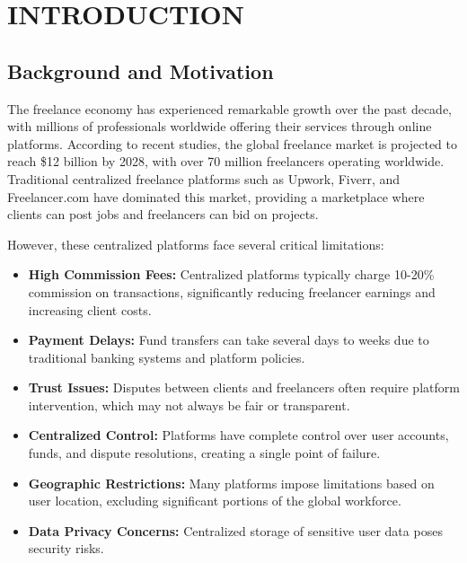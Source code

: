 \documentclass[a4paper,13pt,twoside]{report}
\theoremstyle{definition}
\begin{document}
\newpage
{}
\pagestyle{fancy}
\fancyhf{}
\fancyhead[RE, LO]{\leftmark}
\fancyfoot[RE, LO]{\thepage}

\chapter{INTRODUCTION}
\label{chapter:Introduction}

\section{Background and Motivation}

The freelance economy has experienced remarkable growth over the past decade, with millions of professionals worldwide offering their services through online platforms. According to recent studies, the global freelance market is projected to reach \$12 billion by 2028, with over 70 million freelancers operating worldwide. Traditional centralized freelance platforms such as Upwork, Fiverr, and Freelancer.com have dominated this market, providing a marketplace where clients can post jobs and freelancers can bid on projects.

However, these centralized platforms face several critical limitations:

\begin{itemize}
    \item \textbf{High Commission Fees:} Centralized platforms typically charge 10-20\% commission on transactions, significantly reducing freelancer earnings and increasing client costs.
    \item \textbf{Payment Delays:} Fund transfers can take several days to weeks due to traditional banking systems and platform policies.
    \item \textbf{Trust Issues:} Disputes between clients and freelancers often require platform intervention, which may not always be fair or transparent.
    \item \textbf{Centralized Control:} Platforms have complete control over user accounts, funds, and dispute resolutions, creating a single point of failure.
    \item \textbf{Geographic Restrictions:} Many platforms impose limitations based on user location, excluding significant portions of the global workforce.
    \item \textbf{Data Privacy Concerns:} Centralized storage of sensitive user data poses security risks.
\end{itemize}
\end{document}
